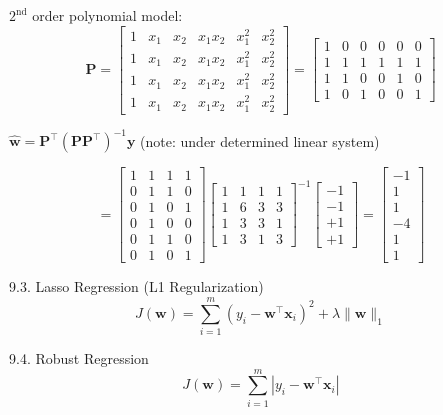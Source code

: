 \documentclass[
]{ctexart}
\begin{document}
\begin{enumerate}
  \(2^{\text{nd}}\) order polynomial model: \[
   \mathbf{P} = \begin{bmatrix} 
   1 & x_1 & x_2 & x_1x_2 & x_1^2 & x_2^2 \\
   1 & x_1 & x_2 & x_1x_2 & x_1^2 & x_2^2 \\
   1 & x_1 & x_2 & x_1x_2 & x_1^2 & x_2^2 \\
   1 & x_1 & x_2 & x_1x_2 & x_1^2 & x_2^2 
   \end{bmatrix} =
   \begin{bmatrix} 
   1 & 0 & 0 & 0 & 0 & 0 \\
   1 & 1 & 1 & 1 & 1 & 1 \\
   1 & 1 & 0 & 0 & 1 & 0 \\
   1 & 0 & 1 & 0 & 0 & 1 
   \end{bmatrix}
   \]

  \(\hat{\mathbf{w}} = \mathbf{P}^\top (\mathbf{P}\mathbf{P}^\top)^{-1} \mathbf{y}\)
  (note: under determined linear system)

  \[
   = \begin{bmatrix}
   1 & 1 & 1 & 1 \\
   0 & 1 & 1 & 0 \\
   0 & 1 & 0 & 1 \\
   0 & 1 & 0 & 0 \\
   0 & 1 & 1 & 0 \\
   0 & 1 & 0 & 1
   \end{bmatrix}
   \begin{bmatrix}
   1 & 1 & 1 & 1 \\
   1 & 6 & 3 & 3 \\
   1 & 3 & 3 & 1 \\
   1 & 3 & 1 & 3
   \end{bmatrix}^{-1}
   \begin{bmatrix}
   -1 \\ -1 \\ +1 \\ +1
   \end{bmatrix} =
   \begin{bmatrix}
   -1 \\ 1 \\ 1 \\ -4 \\ 1 \\ 1
   \end{bmatrix}
   \]

  9.3. Lasso Regression (L1 Regularization)
  \[J(\mathbf{w}) = \sum_{i=1}^{m} (y_i - \mathbf{w}^\top \mathbf{x}_i)^2 + \lambda \|\mathbf{w}\|_1\]

  9.4. Robust Regression
  \[J(\mathbf{w}) = \sum_{i=1}^{m} |y_i - \mathbf{w}^\top \mathbf{x}_i|\]
\end{enumerate}
\end{document}

